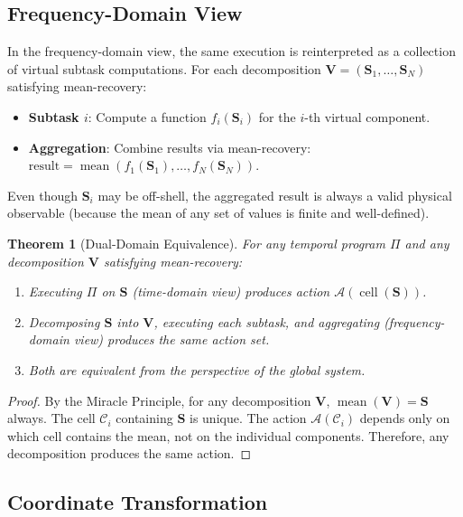 \documentclass[twocolumn,11pt,a4paper]{article}
\newtheorem{theorem}{Theorem}[section]
\newcommand{\Stuple}{\mathbf{S}}
\newcommand{\calC}{\mathcal{C}}
\DeclareMathOperator{\cell}{cell}
\DeclareMathOperator{\mean}{mean}
\begin{document}
\subsection{Frequency-Domain View}

In the frequency-domain view, the same execution is reinterpreted as a collection of virtual subtask computations. For each decomposition $\mathbf{V} = (\Stuple_1, \ldots, \Stuple_N)$ satisfying mean-recovery:

\begin{itemize}[nosep,leftmargin=1em]
  \item \textbf{Subtask $i$}: Compute a function $f_i(\Stuple_i)$ for the $i$-th virtual component.
  \item \textbf{Aggregation}: Combine results via mean-recovery: $\text{result} = \mean(f_1(\Stuple_1), \ldots, f_N(\Stuple_N))$.
\end{itemize}

Even though $\Stuple_i$ may be off-shell, the aggregated result is always a valid physical observable (because the mean of any set of values is finite and well-defined).

\begin{theorem}[Dual-Domain Equivalence]
For any temporal program $\Pi$ and any decomposition $\mathbf{V}$ satisfying mean-recovery:
\begin{enumerate}[nosep,label=(\roman*)]
  \item Executing $\Pi$ on $\Stuple$ (time-domain view) produces action $\mathcal{A}(\cell(\Stuple))$.
  \item Decomposing $\Stuple$ into $\mathbf{V}$, executing each subtask, and aggregating (frequency-domain view) produces the same action set.
  \item Both are equivalent from the perspective of the global system.
\end{enumerate}
\end{theorem}

\begin{proof}
By the Miracle Principle, for any decomposition $\mathbf{V}$, $\mean(\mathbf{V}) = \Stuple$ always. The cell $\calC_i$ containing $\Stuple$ is unique. The action $\mathcal{A}(\calC_i)$ depends only on which cell contains the mean, not on the individual components. Therefore, any decomposition produces the same action.
\end{proof}

\subsection{Coordinate Transformation}
\end{document}
